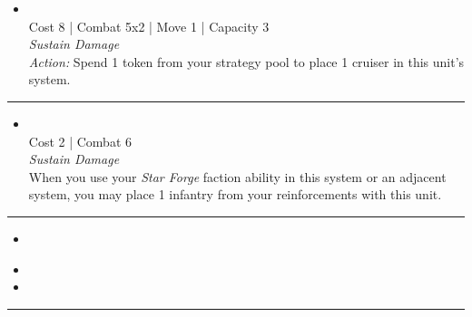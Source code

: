 \begin{multicols}{2}

\begin{itemize}
\item {}\\
Cost 8 | Combat 5x2 | Move 1 | Capacity 3 \\
\emph{Sustain Damage}\\
\emph{Action:} Spend 1 token from your strategy pool to place 1 cruiser in this unit's system.
\end{itemize}

\vspace{-10pt}\rule{\hsize}{0.4pt}\vspace{5pt}


\begin{itemize}
\item {}
\\
Cost 2 | Combat 6 \\
\emph{Sustain Damage}\\
When you use your \emph{Star Forge} faction ability in this system or an adjacent system, you may place 1 infantry from your reinforcements with this unit.
\end{itemize}

\vspace{-10pt}\rule{\hsize}{0.4pt}\vspace{5pt}


\begin{itemize}
\item \prototypeI
\end{itemize}

\columnbreak
{}

\begin{itemize}
\item \prototypeII
\item \magmus
\end{itemize}

\vspace{-10pt}\rule{\hsize}{0.4pt}\vspace{5pt}



\end{multicols}
